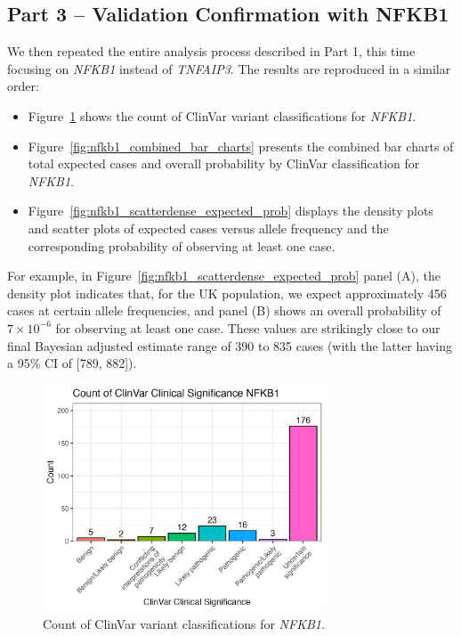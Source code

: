 \subsection{Part 3 -- Validation Confirmation with NFKB1}
We then repeated the entire analysis process described in Part 1, this time focusing on \textit{NFKB1} instead of \textit{TNFAIP3}. The results are reproduced in a similar order:
\begin{itemize}
    \item Figure~\ref{fig:nfkb1_clinvar_count} shows the count of ClinVar variant classifications for \textit{NFKB1}.
    \item Figure~\ref{fig:nfkb1_combined_bar_charts} presents the combined bar charts of total expected cases and overall probability by ClinVar classification for \textit{NFKB1}.
    \item Figure~\ref{fig:nfkb1_scatterdense_expected_prob} displays the density plots and scatter plots of expected cases versus allele frequency and the corresponding probability of observing at least one case.
\end{itemize}
For example, in Figure~\ref{fig:nfkb1_scatterdense_expected_prob} panel (A), the density plot indicates that, for the UK population, we expect approximately 456 cases at certain allele frequencies, and panel (B) shows an overall probability of \(7 \times 10^{-6}\) for observing at least one case. These values are strikingly close to our final Bayesian adjusted estimate range of 390 to 835 cases (with the latter having a 95\% CI of [789, 882]).

\begin{figure}[ht]
  \centering
  \includegraphics[width=0.75\textwidth]{../images/nfkb1_clinvar_count.png}
  \caption{Count of ClinVar variant classifications for \textit{NFKB1}.}
  \label{fig:nfkb1_clinvar_count}
\end{figure}

